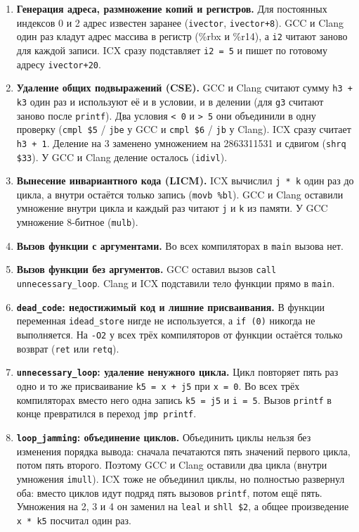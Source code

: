 \documentclass[a4paper]{article}
\begin{document}
\begin{enumerate}
    \item \textbf{Генерация адреса, размножение копий и регистров.} Для постоянных индексов 0 и 2 адрес известен заранее (\texttt{ivector}, \texttt{ivector+8}). GCC и Clang один раз кладут адрес массива в регистр (\%rbx и \%r14), а \texttt{i2} читают заново для каждой записи. ICX сразу подставляет \texttt{i2 = 5} и пишет по готовому адресу \texttt{ivector+20}.
    \item \textbf{Удаление общих подвыражений (CSE).} GCC и Clang считают сумму \texttt{h3 + k3} один раз и используют её и в условии, и в делении (для \texttt{g3} считают заново после \texttt{printf}). Два условия \texttt{< 0} и \texttt{> 5} они объединили в одну проверку (\texttt{cmpl \$5} / \texttt{jbe} у GCC и \texttt{cmpl \$6} / \texttt{jb} у Clang). ICX сразу считает \texttt{h3 + 1}. Деление на 3 заменено умножением на 2863311531 и сдвигом (\texttt{shrq \$33}). У GCC и Clang деление осталось (\texttt{idivl}).
    \item \textbf{Вынесение инвариантного кода (LICM).} ICX вычислил \texttt{j * k} один раз до цикла, а внутри остаётся только запись (\texttt{movb \%bl}). GCC и Clang оставили умножение внутри цикла и каждый раз читают \texttt{j} и \texttt{k} из памяти. У GCC умножение 8-битное (\texttt{mulb}).
    \item \textbf{Вызов функции с аргументами.} Во всех компиляторах в \texttt{main} вызова нет.
    \item \textbf{Вызов функции без аргументов.} GCC оставил вызов \texttt{call unnecessary\_loop}. Clang и ICX подставили тело функции прямо в \texttt{main}.
    \item \textbf{\texttt{dead\_code}: недостижимый код и лишние присваивания.} В функции переменная \texttt{idead\_store} нигде не используется, а \texttt{if (0)} никогда не выполняется. На \texttt{-O2} у всех трёх компиляторов от функции остаётся только возврат (\texttt{ret} или \texttt{retq}).
    \item \textbf{\texttt{unnecessary\_loop}: удаление ненужного цикла.} Цикл повторяет пять раз одно и то же присваивание \texttt{k5 = x + j5} при \texttt{x = 0}. Во всех трёх компиляторах вместо него одна запись \texttt{k5 = j5} и \texttt{i = 5}. Вызов \texttt{printf} в конце превратился в переход \texttt{jmp printf}.
    \item \textbf{\texttt{loop\_jamming}: объединение циклов.} Объединить циклы нельзя без изменения порядка вывода: сначала печатаются пять значений первого цикла, потом пять второго. Поэтому GCC и Clang оставили два цикла (внутри умножения \texttt{imull}). ICX тоже не объединил циклы, но полностью развернул оба: вместо циклов идут подряд пять вызовов \texttt{printf}, потом ещё пять. Умножения на 2, 3 и 4 он заменил на \texttt{leal} и \texttt{shll \$2}, а общее произведение \texttt{x * k5} посчитал один раз.

\end{enumerate}
\end{document}
